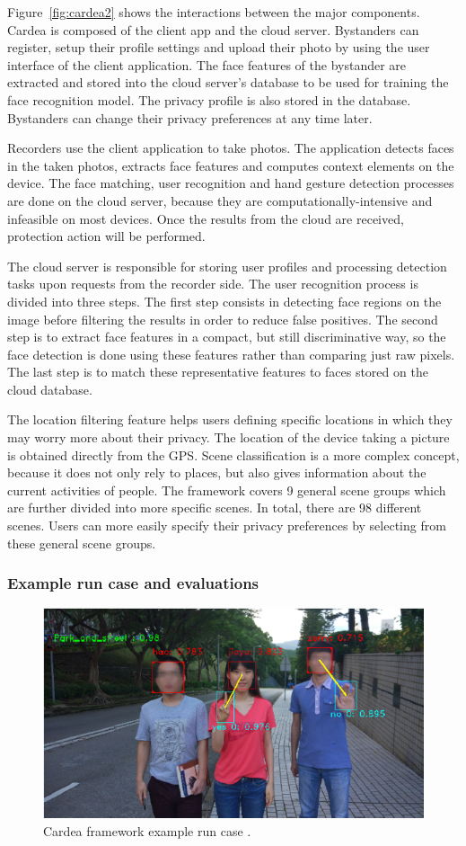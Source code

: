 \documentclass[conference]{IEEEtran}
\begin{document}
Figure~\ref{fig:cardea2} shows the interactions between the major components. Cardea is composed of the client app and the cloud server. Bystanders can register, setup their profile settings and upload their photo by using the user interface of the client application. The face features of the bystander are extracted and stored into the cloud server's database to be used for training the face recognition model. The privacy profile is also stored in the database. Bystanders can change their privacy preferences at any time later. 

Recorders use the client application to take photos. The application detects faces in the taken photos, extracts face features and computes context elements on the device. The face matching, user recognition and hand gesture detection processes are done on the cloud server, because they are computationally-intensive and infeasible on most devices. Once the results from the cloud are received, protection action will be performed. 

The cloud server is responsible for storing user profiles and processing detection tasks upon requests from the recorder side. The user recognition process is divided into three steps. The first step consists in detecting face regions on the image before filtering the results in order to reduce false positives. The second step is to extract face features in a compact, but still discriminative way, so the face detection is done using these features rather than comparing just raw pixels. The last step is to match these representative features to faces stored on the cloud database. 

The location filtering feature helps users defining specific locations in which they may worry more about their privacy. The location of the device taking a picture is obtained directly from the \ac{GPS}. Scene classification is a more complex concept, because it does not only rely to places, but also gives information about the current activities of people. The framework covers 9 general scene groups which are further divided into more specific scenes. In total, there are 98 different scenes. Users can more easily specify their privacy preferences by selecting from these general scene groups. 


\subsubsection{Example run case and evaluations}
\begin{figure}[t]
\centerline{\includegraphics[width=.5\textwidth]{img/cardea_example.png}}
\caption{Cardea framework example run case \cite{shu2016cardea}.}
\label{fig:cardea3}
\end{figure}
\end{document}
